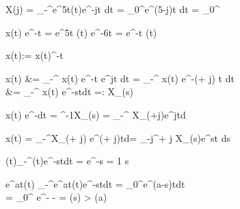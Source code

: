 \begin{abox}
	X(j\omega) = \int_{-\infty}^{\infty}e^{5t}\epsilon(t)\cdot e^{-j\omega t} dt = \int_{0}^{\infty}e^{(5-j\omega)\cdot t} dt = _0^\infty \to \infty
\end{abox}

\begin{abox}
	x(t) \cdot e^{-\sigma t} = e^{5t} \cdot \epsilon(t) \cdot e^{-6t} = e^{-t} \cdot \epsilon(t)
\end{abox}

\begin{abox}
	\left\lbrace x(t)\right\rbrace  := \left\lbrace x(t)\cdot \epsilon^{-\sigma t}\right\rbrace 
\end{abox}

\begin{abox}
	\left\lbrace x(t) \right\rbrace &= \int_{-\infty}^{\infty} x(t) e^{-\sigma t} \cdot e^{j\omega t} dt = \int_{-\infty}^{\infty} x(t) e^{-(\sigma + j\omega) t} dt\\
	&= \int_{-\infty}^{\infty} x(t) \cdot e^{-st}dt =: X_{}(s)
\end{abox}

\begin{abox}
	x(t) e^{-dt} = ^{-1}\left\lbrace X_{}(s) \right\rbrace =  \int_{-\infty}^{\infty} X_{}(\sigma+j\omega)\cdot e^{j\omega t}d\omega
\end{abox}

\begin{abox}
	x(t) = \int_{-\infty}^{\infty}X_{}(\sigma + j\omega) \cdot e^{(\sigma + j\omega)\cdot t}d\omega =  \int_{\sigma -j\infty}^{\sigma + j \infty}X_{}(s)\cdot e^{st} ds
\end{abox}

\begin{abox}
	\delta(t)\slaplace \int_{-\infty}^{\infty}\delta(t)\cdot e^{-st}dt = e^{-s} = 1  s \in {}
\end{abox}

\begin{abox}
	e^{at}\epsilon(t) \slaplace \int_{-\infty}^{\infty}e^{at}\epsilon(t)e^{-st}dt = \int_{0}^{\infty}e^{(a-s)t}dt
	\\= _{0}^{\infty}  e^{-\infty} -  =   (s) > (a)
\end{abox}

